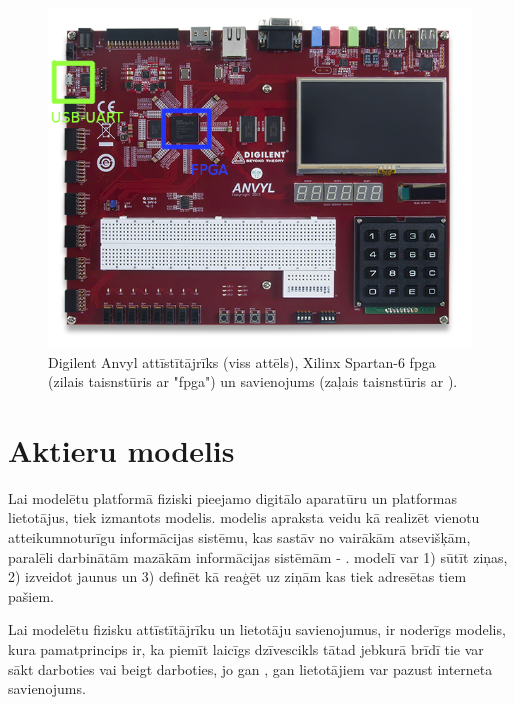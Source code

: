 \begin{figure}[H]
    \includegraphics[width=0.7\linewidth]{assets/anvyl-explained.png}
    \centering
    \caption{Digilent Anvyl attīstītājrīks (viss attēls), Xilinx Spartan-6
        \gls{fpga} (zilais taisnstūris ar "\gls{fpga}") un  savienojums
        (zaļais taisnstūris ar ).}
    \label{fig:anvylexplained}
\end{figure}

\section{Aktieru modelis}
\label{sec:actormodel}

Lai modelētu platformā fiziski pieejamo digitālo aparatūru un platformas
lietotājus, tiek izmantots  modelis.
 modelis apraksta veidu kā realizēt vienotu
atteikumnoturīgu informācijas sistēmu, kas sastāv no vairākām atsevišķām,
paralēli darbinātām mazākām informācijas sistēmām - .
 modelī  var 1) sūtīt ziņas, 2)
izveidot jaunus  un 3) definēt kā reaģēt uz ziņām kas
tiek adresētas tiem pašiem. \cite[p. 1]{CarlHewitt2010}

Lai modelētu fizisku attīstītājrīku  un lietotāju
savienojumus, ir noderīgs  modelis, kura pamatprincips
ir, ka  piemīt laicīgs dzīvescikls tātad jebkurā brīdī
tie var sākt darboties vai beigt darboties, jo gan ,
gan lietotājiem var pazust interneta savienojums.
\cite[p. 6]{CarlHewitt2010} 
 
